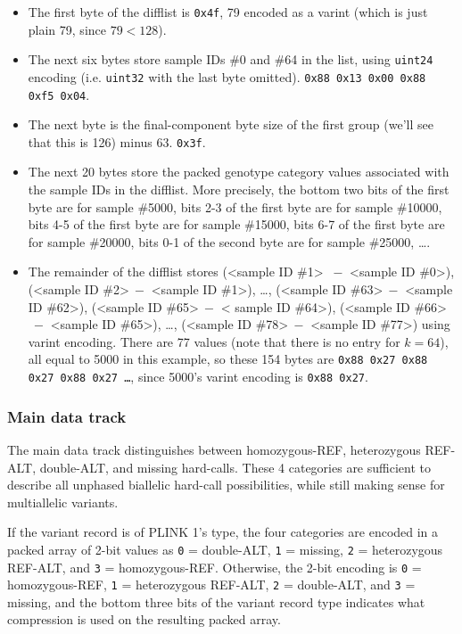 \documentclass[8pt]{article}
\begin{document}
\begin{itemize}
\item The first byte of the difflist is \texttt{0x4f}, 79 encoded as a
  varint (which is just plain 79, since $79<128$).
\item The next six bytes store sample IDs \#0 and \#64 in the list, using
  \texttt{uint24} encoding (i.e. \texttt{uint32} with the last byte omitted).
  \texttt{0x88 0x13 0x00 0x88 0xf5 0x04}.
\item The next byte is the final-component byte size of the first group (we'll
  see that this is 126) minus 63.  \texttt{0x3f}.
\item The next 20 bytes store the packed genotype category values associated
  with the sample IDs in the difflist.  More precisely, the bottom two bits of
  the first byte are for sample \#5000, bits 2-3 of the first byte are for
  sample \#10000, bits 4-5 of the first byte are for sample \#15000, bits 6-7
  of the first byte are for sample \#20000, bits 0-1 of the second byte are for
  sample \#25000, \ldots .
\item The remainder of the difflist stores (\textless sample ID \#1\textgreater
  $\>-$ \textless sample ID \#0\textgreater ), (\textless sample ID
  \#2\textgreater $\>-$ \textless sample ID \#1\textgreater ), \ldots ,
  (\textless sample ID \#63\textgreater $\>-$ \textless sample ID
  \#62\textgreater ), (\textless sample ID \#65\textgreater $\>-$ \textless
  sample ID \#64\textgreater ), (\textless sample ID \#66\textgreater $\>-$
  \textless sample ID \#65\textgreater ), \ldots , (\textless sample ID
  \#78\textgreater $\>-$ \textless sample ID \#77\textgreater ) using varint
  encoding.  There are 77 values (note that there is no entry for $k=64$), all
  equal to 5000 in this example, so these 154 bytes are \texttt{0x88 0x27 0x88
  0x27 0x88 0x27 \ldots}, since 5000's varint encoding is \texttt{0x88 0x27}.
\end{itemize}

\subsubsection{Main data track}

The main data track distinguishes between homozygous-REF, heterozygous REF-ALT,
double-ALT, and missing hard-calls.  These 4 categories are sufficient to
describe all unphased biallelic hard-call possibilities, while still making
sense for multiallelic variants.

If the variant record is of PLINK 1's type, the four categories are encoded in
a packed array of 2-bit values as \texttt{0} = double-ALT, \texttt{1} =
missing, \texttt{2} = heterozygous REF-ALT, and \texttt{3} = homozygous-REF.
Otherwise, the 2-bit encoding is \texttt{0} = homozygous-REF, \texttt{1} =
heterozygous REF-ALT, \texttt{2} = double-ALT, and \texttt{3} = missing, and
the bottom three bits of the variant record type indicates what compression is
used on the resulting packed array.
\end{document}
